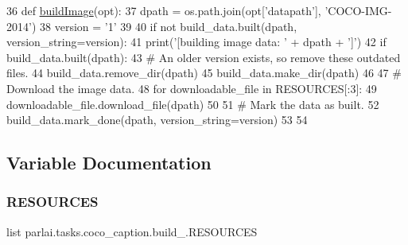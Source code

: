 \begin{DoxyCode}
36 \textcolor{keyword}{def }\hyperlink{namespaceparlai_1_1tasks_1_1coco__caption_1_1build__2014_acd8cdd7a90cf4d7d348184dd2ca1545b}{buildImage}(opt):
37     dpath = os.path.join(opt[\textcolor{stringliteral}{'datapath'}], \textcolor{stringliteral}{'COCO-IMG-2014'})
38     version = \textcolor{stringliteral}{'1'}
39 
40     \textcolor{keywordflow}{if} \textcolor{keywordflow}{not} build\_data.built(dpath, version\_string=version):
41         print(\textcolor{stringliteral}{'[building image data: '} + dpath + \textcolor{stringliteral}{']'})
42         \textcolor{keywordflow}{if} build\_data.built(dpath):
43             \textcolor{comment}{# An older version exists, so remove these outdated files.}
44             build\_data.remove\_dir(dpath)
45         build\_data.make\_dir(dpath)
46 
47         \textcolor{comment}{# Download the image data.}
48         \textcolor{keywordflow}{for} downloadable\_file \textcolor{keywordflow}{in} RESOURCES[:3]:
49             downloadable\_file.download\_file(dpath)
50 
51         \textcolor{comment}{# Mark the data as built.}
52         build\_data.mark\_done(dpath, version\_string=version)
53 
54 
\end{DoxyCode}


\subsection{Variable Documentation}
\mbox{\label{namespaceparlai_1_1tasks_1_1coco__caption_1_1build__2014_a34b0e0383905c80da95158adb4994417}} 
\subsubsection{\texorpdfstring{R\+E\+S\+O\+U\+R\+C\+ES}{RESOURCES}}
{\footnotesize\ttfamily list parlai.\+tasks.\+coco\+\_\+caption.\+build\+\_.\+R\+E\+S\+O\+U\+R\+C\+ES}

